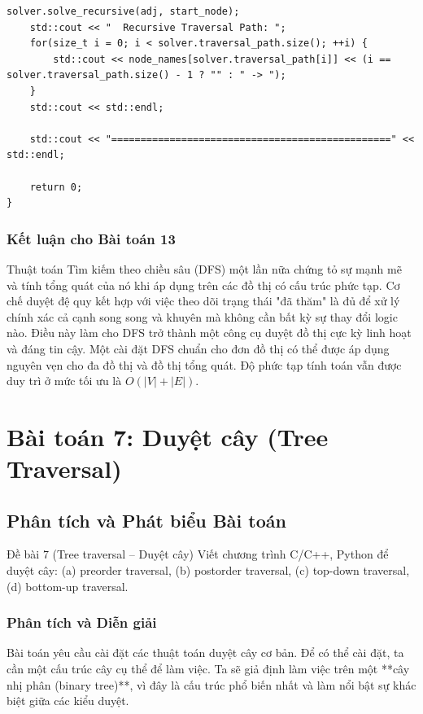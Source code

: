 \documentclass[a4paper,12pt]{article}
\begin{document}
\begin{lstlisting}[style=cppstyle, caption={Cài đặt DFS cho đồ thị tổng quát trong C++.}, label={lst:cpp_dfs_13}]
    solver.solve_recursive(adj, start_node);
    std::cout << "  Recursive Traversal Path: ";
    for(size_t i = 0; i < solver.traversal_path.size(); ++i) {
        std::cout << node_names[solver.traversal_path[i]] << (i == solver.traversal_path.size() - 1 ? "" : " -> ");
    }
    std::cout << std::endl;
    
    std::cout << "================================================" << std::endl;

    return 0;
}
\end{lstlisting}

\subsubsection{Kết luận cho Bài toán 13}
Thuật toán Tìm kiếm theo chiều sâu (DFS) một lần nữa chứng tỏ sự mạnh mẽ và tính tổng quát của nó khi áp dụng trên các đồ thị có cấu trúc phức tạp. Cơ chế duyệt đệ quy kết hợp với việc theo dõi trạng thái "đã thăm" là đủ để xử lý chính xác cả cạnh song song và khuyên mà không cần bất kỳ sự thay đổi logic nào. Điều này làm cho DFS trở thành một công cụ duyệt đồ thị cực kỳ linh hoạt và đáng tin cậy. Một cài đặt DFS chuẩn cho đơn đồ thị có thể được áp dụng nguyên vẹn cho đa đồ thị và đồ thị tổng quát. Độ phức tạp tính toán vẫn được duy trì ở mức tối ưu là $O(|V| + |E|)$.


\section{Bài toán 7: Duyệt cây (Tree Traversal)}

\subsection{Phân tích và Phát biểu Bài toán}

\begin{problembox}{Đề bài 7 (Tree traversal -- Duyệt cây)}
    Viết chương trình C/C++, Python để duyệt cây: (a) preorder traversal, (b) postorder traversal, (c) top-down traversal, (d) bottom-up traversal.
\end{problembox}

\subsubsection{Phân tích và Diễn giải}
Bài toán yêu cầu cài đặt các thuật toán duyệt cây cơ bản. Để có thể cài đặt, ta cần một cấu trúc cây cụ thể để làm việc. Ta sẽ giả định làm việc trên một **cây nhị phân (binary tree)**, vì đây là cấu trúc phổ biến nhất và làm nổi bật sự khác biệt giữa các kiểu duyệt.
\end{document}
